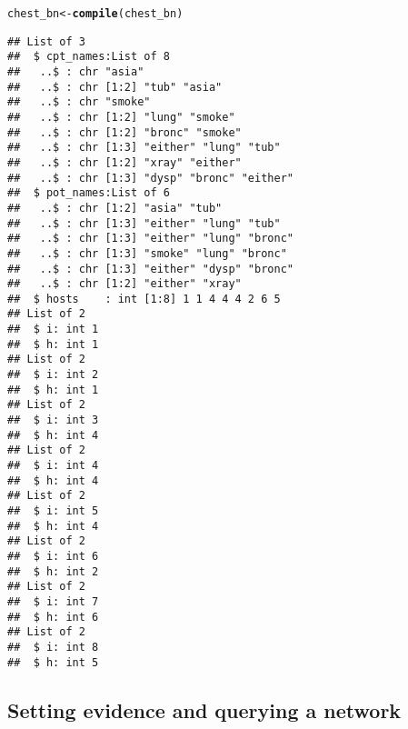 \documentclass[10pt]{article}\usepackage[]{graphicx}\usepackage[]{xcolor}
\makeatletter
\newcommand{\hlstd}[1]{\textcolor[rgb]{0.345,0.345,0.345}{#1}}%
\newcommand{\hlkwb}[1]{\textcolor[rgb]{0.69,0.353,0.396}{#1}}%
\newcommand{\hlkwd}[1]{\textcolor[rgb]{0.737,0.353,0.396}{\textbf{#1}}}%
\newenvironment{kframe}{%
 \def\at@end@of@kframe{}%
 \ifinner\ifhmode%
  \def\at@end@of@kframe{\end{minipage}}%
  \begin{minipage}{\columnwidth}%
 \fi\fi%
 \def\FrameCommand##1{\hskip\@totalleftmargin \hskip-\fboxsep
 \colorbox{shadecolor}{##1}\hskip-\fboxsep
     \hskip-\linewidth \hskip-\@totalleftmargin \hskip\columnwidth}%
 \MakeFramed {\advance\hsize-\width
   \@totalleftmargin\z@ \linewidth\hsize
   \@setminipage}}%
 {\par\unskip\endMakeFramed%
 \at@end@of@kframe}
\newenvironment{knitrout}{}{} %
\makeatother
\begin{document}
\begin{enumerate}
\begin{knitrout}
\color{fgcolor}\begin{kframe}
\begin{alltt}
\hlstd{chest_bn} \hlkwb{<-} \hlkwd{compile}\hlstd{(chest_bn)}
\end{alltt}
\begin{verbatim}
## List of 3
##  $ cpt_names:List of 8
##   ..$ : chr "asia"
##   ..$ : chr [1:2] "tub" "asia"
##   ..$ : chr "smoke"
##   ..$ : chr [1:2] "lung" "smoke"
##   ..$ : chr [1:2] "bronc" "smoke"
##   ..$ : chr [1:3] "either" "lung" "tub"
##   ..$ : chr [1:2] "xray" "either"
##   ..$ : chr [1:3] "dysp" "bronc" "either"
##  $ pot_names:List of 6
##   ..$ : chr [1:2] "asia" "tub"
##   ..$ : chr [1:3] "either" "lung" "tub"
##   ..$ : chr [1:3] "either" "lung" "bronc"
##   ..$ : chr [1:3] "smoke" "lung" "bronc"
##   ..$ : chr [1:3] "either" "dysp" "bronc"
##   ..$ : chr [1:2] "either" "xray"
##  $ hosts    : int [1:8] 1 1 4 4 4 2 6 5
## List of 2
##  $ i: int 1
##  $ h: int 1
## List of 2
##  $ i: int 2
##  $ h: int 1
## List of 2
##  $ i: int 3
##  $ h: int 4
## List of 2
##  $ i: int 4
##  $ h: int 4
## List of 2
##  $ i: int 5
##  $ h: int 4
## List of 2
##  $ i: int 6
##  $ h: int 2
## List of 2
##  $ i: int 7
##  $ h: int 6
## List of 2
##  $ i: int 8
##  $ h: int 5
\end{verbatim}
\end{kframe}
\end{knitrout}

\end{enumerate}







\subsection{Setting evidence and querying a network}
\label{sec:querying-network}
\end{document}
